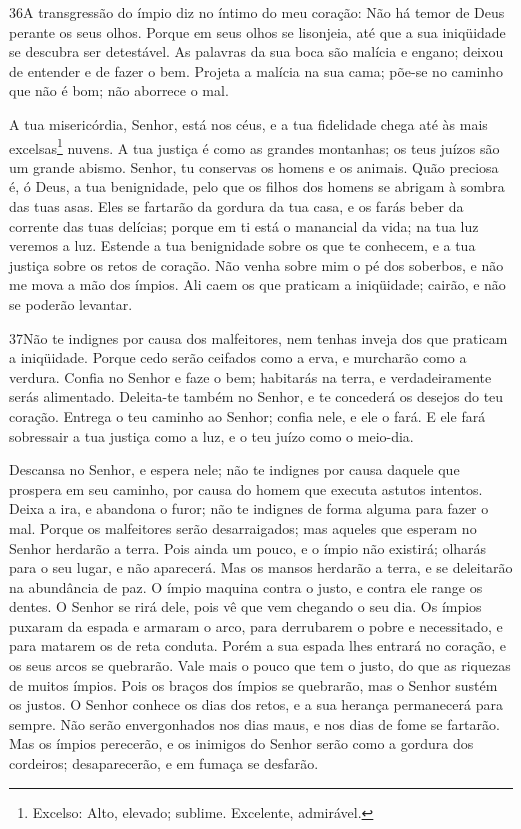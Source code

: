 \bigskip

\lettrine{36}{}A transgressão do ímpio diz no íntimo do meu
coração: Não há temor de Deus perante os seus olhos. Porque em
seus olhos se lisonjeia, até que a sua iniqüidade se descubra ser
detestável. As palavras da sua boca são malícia e engano; deixou
de entender e de fazer o bem. Projeta a malícia na sua cama;
põe-se no caminho que não é bom; não aborrece o mal.

A tua misericórdia, Senhor, está nos céus, e a tua fidelidade
chega até às mais excelsas\footnote{Excelso: Alto, elevado; sublime.
Excelente, admirável.} nuvens. A tua justiça é como as grandes
montanhas; os teus juízos são um grande abismo. Senhor, tu conservas
os homens e os animais. Quão preciosa é, ó Deus, a tua
benignidade, pelo que os filhos dos homens se abrigam à sombra das
tuas asas. Eles se fartarão da gordura da tua casa, e os farás
beber da corrente das tuas delícias; porque em ti está o
manancial da vida; na tua luz veremos a luz. Estende a tua
benignidade sobre os que te conhecem, e a tua justiça sobre os retos
de coração. Não venha sobre mim o pé dos soberbos, e não me
mova a mão dos ímpios. Ali caem os que praticam a iniqüidade;
cairão, e não se poderão levantar.

\bigskip

\lettrine{37}{}Não te indignes por causa dos malfeitores, nem
tenhas inveja dos que praticam a iniqüidade. Porque cedo serão
ceifados como a erva, e murcharão como a verdura. Confia no
Senhor e faze o bem; habitarás na terra, e verdadeiramente serás
alimentado. Deleita-te também no Senhor, e te concederá os
desejos do teu coração. Entrega o teu caminho ao Senhor; confia
nele, e ele o fará. E ele fará sobressair a tua justiça como a
luz, e o teu juízo como o meio-dia.

Descansa no Senhor, e espera nele; não te indignes por causa
daquele que prospera em seu caminho, por causa do homem que executa
astutos intentos. Deixa a ira, e abandona o furor; não te
indignes de forma alguma para fazer o mal. Porque os malfeitores
serão desarraigados; mas aqueles que esperam no Senhor herdarão a
terra. Pois ainda um pouco, e o ímpio não existirá; olharás
para o seu lugar, e não aparecerá. Mas os mansos herdarão a
terra, e se deleitarão na abundância de paz. O ímpio maquina
contra o justo, e contra ele range os dentes. O Senhor se
rirá dele, pois vê que vem chegando o seu dia. Os ímpios
puxaram da espada e armaram o arco, para derrubarem o pobre e
necessitado, e para matarem os de reta conduta. Porém a sua
espada lhes entrará no coração, e os seus arcos se quebrarão.
Vale mais o pouco que tem o justo, do que as riquezas de
muitos ímpios. Pois os braços dos ímpios se quebrarão, mas o
Senhor sustém os justos.
 O Senhor conhece os dias dos retos, e a sua herança permanecerá
para sempre. Não serão envergonhados nos dias maus, e nos
dias de fome se fartarão. Mas os ímpios perecerão, e os
inimigos do Senhor serão como a gordura dos cordeiros;
desaparecerão, e em fumaça se desfarão.

